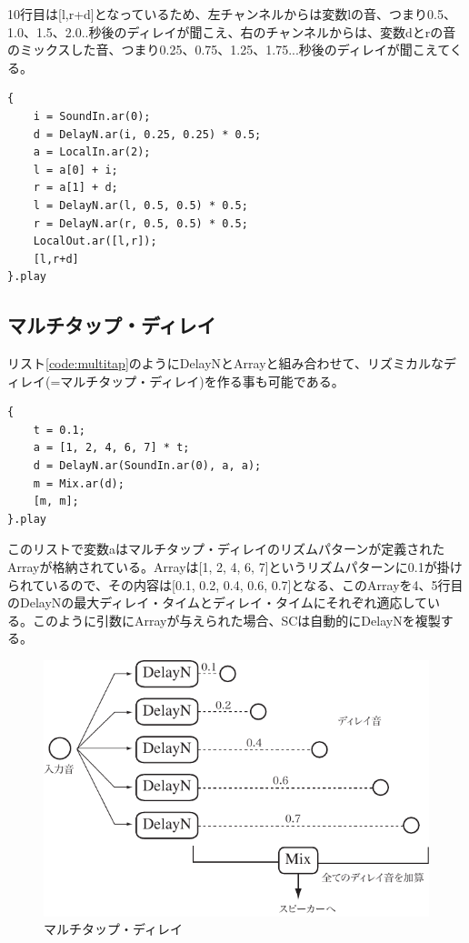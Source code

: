 \documentclass{jsarticle}
\begin{document}
10行目は[l,r+d]となっているため、左チャンネルからは変数lの音、つまり0.5、1.0、1.5、2.0..秒後のディレイが聞こえ、右のチャンネルからは、変数dとrの音のミックスした音、つまり0.25、0.75、1.25、1.75...秒後のディレイが聞こえてくる。

\begin{lstlisting}[caption=ピンポン・ディレイ, label=code:pp]
{
	i = SoundIn.ar(0);
	d = DelayN.ar(i, 0.25, 0.25) * 0.5;
	a = LocalIn.ar(2);
	l = a[0] + i;
	r = a[1] + d;
	l = DelayN.ar(l, 0.5, 0.5) * 0.5; 
	r = DelayN.ar(r, 0.5, 0.5) * 0.5;
	LocalOut.ar([l,r]);
	[l,r+d]
}.play
\end{lstlisting}

\subsection{マルチタップ・ディレイ}
リスト\ref{code:multitap}のようにDelayNとArrayと組み合わせて、リズミカルなディレイ(=マルチタップ・ディレイ)を作る事も可能である。

\begin{lstlisting}[caption=マルチタップ・ディレイ, label=code:multitap]
{
	t = 0.1;
	a = [1, 2, 4, 6, 7] * t;
	d = DelayN.ar(SoundIn.ar(0), a, a);
	m = Mix.ar(d);
	[m, m];
}.play
\end{lstlisting}

このリストで変数aはマルチタップ・ディレイのリズムパターンが定義されたArrayが格納されている。Arrayは[1, 2, 4, 6, 7]というリズムパターンに0.1が掛けられているので、その内容は[0.1, 0.2, 0.4, 0.6, 0.7]となる、このArrayを4、5行目のDelayNの最大ディレイ・タイムとディレイ・タイムにそれぞれ適応している。このように引数にArrayが与えられた場合、SCは自動的にDelayNを複製する。

\begin{figure}[htbp]
	\begin{center}
		\includegraphics[scale=0.7]{multitap.pdf}
	\end{center}
	\caption{マルチタップ・ディレイ}
	\label{fig:multitap}
\end{figure}
\end{document}
